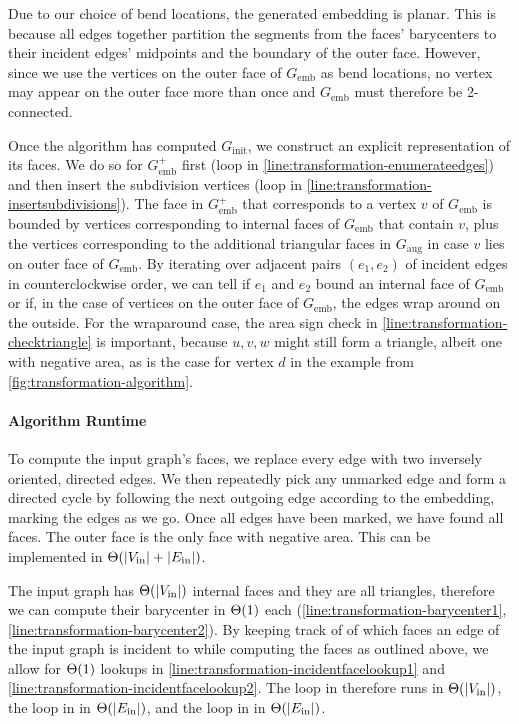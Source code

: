 Due to our choice of bend locations, the generated embedding is planar. This is because all edges together partition the segments from the faces' barycenters to their incident edges' midpoints and the boundary of the outer face. However, since we use the vertices on the outer face of $G_\text{emb}$ as bend locations, no vertex may appear on the outer face more than once and $G_\text{emb}$ must therefore be 2-connected.

Once the algorithm has computed $G_\text{init}$, we construct an explicit representation of its faces. We do so for $G_\text{emb}^+$ first (loop in \cref{line:transformation-enumerateedges}) and then insert the subdivision vertices (loop in \cref{line:transformation-insertsubdivisions}). The face in $G_\text{emb}^+$ that corresponds to a vertex $v$ of $G_\text{emb}$ is bounded by vertices corresponding to internal faces of $G_\text{emb}$ that contain $v$, plus the vertices corresponding to the additional triangular faces in $G_\text{aug}$ in case $v$ lies on outer face of $G_\text{emb}$. By iterating over adjacent pairs $(e_1, e_2)$ of incident edges in counterclockwise order, we can tell if $e_1$ and $e_2$ bound an internal face of $G_\text{emb}$ or if, in the case of vertices on the outer face of $G_\text{emb}$, the edges wrap around on the outside. For the wraparound case, the area sign check in \cref{line:transformation-checktriangle} is important, because $u,v,w$ might still form a triangle, albeit one with negative area, as is the case for vertex $d$ in the example from \cref{fig:transformation-algorithm}.



\paragraph{Algorithm Runtime}

To compute the input graph's faces, we replace every edge with two inversely oriented, directed edges. We then repeatedly pick any unmarked edge and form a directed cycle by following the next outgoing edge according to the embedding, marking the edges as we go. Once all edges have been marked, we have found all faces. The outer face is the only face with negative area. This can be implemented in $\Theta(\left\lvert V_\text{in}\right\rvert + \left\lvert E_\text{in}\right\rvert)$.

The input graph has $\Theta(\left\lvert V_\text{in}\right\rvert)$ internal faces and they are all triangles, therefore we can compute their barycenter in $\Theta(1)$ each (\cref{line:transformation-barycenter1}, \cref{line:transformation-barycenter2}). By keeping track of of which faces an edge of the input graph is incident to while computing the faces as outlined above, we allow for $\Theta(1)$ lookups in \cref{line:transformation-incidentfacelookup1} and \cref{line:transformation-incidentfacelookup2}. The loop in  therefore runs in $\Theta(\left\lvert V_\text{in}\right\rvert)$, the loop in  in $\Theta(\left\lvert E_\text{in}\right\rvert)$, and the loop in  in $\Theta(\left\lvert E_\text{in}\right\rvert)$.

